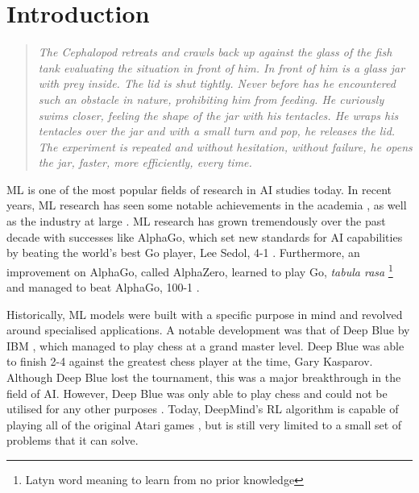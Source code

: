 \chapter{Introduction}
\label{chap:introduction}

\begin{quote}
    \textit{The Cephalopod retreats and crawls back up against the glass of the fish tank
        evaluating the situation in front of him. In front of him is a glass jar with
        prey inside. The lid is shut tightly. Never before has he encountered such an
        obstacle in nature, prohibiting him from feeding. He curiously swims closer,
        feeling the shape of the jar with his tentacles. He wraps his tentacles over the
        jar and with a small turn and pop, he releases the lid. The experiment is
        repeated and without hesitation, without failure, he opens the jar, faster, more
    efficiently, every time.}
\end{quote}

\Ac{ML} is one of the most popular fields of research in \ac{AI} studies today.
In recent years, \ac{ML} research has seen some notable achievements in the
academia \cite{ref:lecun:2015, ref:glorot:2010, ref:goodfellow:2014,
ref:quoc:2017}, as well as the industry at large \cite{ref:silver:2016,
ref:silver:2017, ref:zoph:2017, ref:lewis:2017}.  \ac{ML} research has grown
tremendously over the past decade with successes like AlphaGo, which set new
standards for \ac{AI} capabilities by beating the world's best Go player, Lee
Sedol, 4-1 \cite{ref:san-hun:2016}.  Furthermore, an improvement on AlphaGo,
called AlphaZero, learned to play Go, \textit{tabula rasa} \footnote{Latyn word
meaning to learn from no prior knowledge} and managed to beat AlphaGo, 100-1
\cite{ref:silver:2017}.

Historically, \ac{ML} models were built with a specific purpose in mind and
revolved around specialised applications. A notable development was that of Deep
Blue by IBM \cite{ref:keene:1996}, which managed to play chess at a grand master
level. Deep Blue was able to finish 2-4 against the greatest chess player at the
time, Gary Kasparov. Although Deep Blue lost the tournament, this was a major
breakthrough in the field of \ac{AI}. However, Deep Blue was only able to play
chess and could not be utilised for any other purposes \cite{ref:kelley:2010}.
Today, DeepMind's \ac{RL} algorithm is capable of playing all of the original
Atari games \cite{ref:mnih:2013}, but is still very limited to a small set of
problems that it can solve. 

